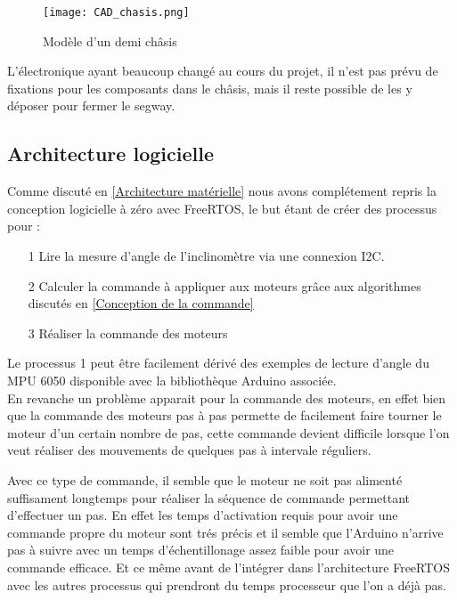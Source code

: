 \documentclass[oneside,a4paper,12pt]{article}
\begin{document}
	\newpage
	
	\begin{figure}[h]
		\centering
		\texttt{[image: CAD\_chasis.png]}
		\caption{Modèle d'un  demi châsis}
	\end{figure}

	L'électronique ayant beaucoup changé au cours du projet, il n'est pas prévu de fixations pour les composants dans le châsis, mais il reste possible de les y déposer pour fermer le segway.
	
	\subsection{Architecture logicielle}
	\label{subsection:Architecture logicielle}
	
	Comme discuté en \ref{Architecture matérielle} nous avons complétement repris la conception logicielle à zéro avec FreeRTOS, le but étant de créer des processus pour :
	
	\begin{itemize}
		\item[1] Lire la mesure d'angle de l'inclinomètre via une connexion I2C.
		\item[2] Calculer la commande à appliquer aux moteurs grâce aux algorithmes discutés en \ref{Conception de la commande}
		\item[3] Réaliser la commande des moteurs
	\end{itemize}
	
	Le processus 1 peut être facilement dérivé des exemples de lecture d'angle du MPU 6050 disponible avec la bibliothèque Arduino associée.\\
	En revanche un problème apparait pour la commande des moteurs, en effet bien que la commande des moteurs pas à pas permette de facilement faire tourner le moteur d'un certain nombre de pas, cette commande devient difficile lorsque l'on veut réaliser des mouvements de quelques pas à intervale réguliers.
	
	Avec ce type de commande, il semble que le moteur ne soit pas alimenté suffisament longtemps pour réaliser la séquence de commande permettant d'effectuer un pas. En effet les temps d'activation requis pour avoir une commande propre du moteur sont trés précis et il semble que l'Arduino n'arrive pas à suivre avec un temps d'échentillonage assez faible pour avoir une commande efficace. Et ce même avant de l'intégrer dans l'architecture FreeRTOS avec les autres processus qui prendront du temps processeur que l'on a déjà pas.
	
\end{document}
